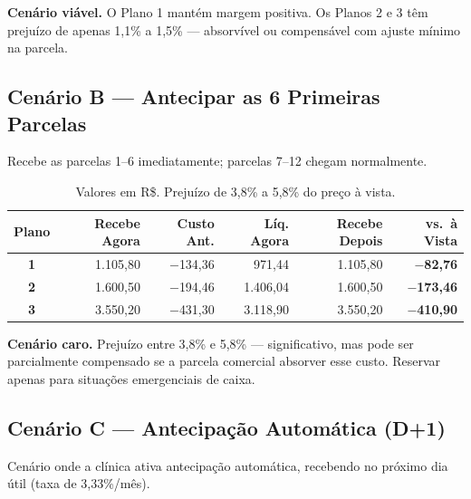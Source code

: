 \documentclass[12pt, a4paper]{article}
\begin{document}
\textcolor{successGreen}{\textbf{Cenário viável.}} O Plano 1 mantém margem positiva. Os Planos 2 e 3 têm prejuízo de apenas 1,1\% a 1,5\% — absorvível ou compensável com ajuste mínimo na parcela.

\subsection{Cenário B — Antecipar as 6 Primeiras Parcelas}

Recebe as parcelas 1--6 imediatamente; parcelas 7--12 chegam normalmente.

\begin{table}[H]
    \centering
    \footnotesize
    \renewcommand{\arraystretch}{1.4}
    \begin{tabularx}{\textwidth}{c r r r r r}
        \toprule
        \rowcolor{tableHeader} \textbf{Plano} & \textbf{Recebe Agora} & \textbf{Custo Ant.} & \textbf{Líq. Agora} & \textbf{Recebe Depois} & \textbf{vs.\ à Vista} \\
        \midrule
        \textbf{1} & 1.105,80 & $-$134,36 & 971,44 & 1.105,80 & \textcolor{warningOrange}{\textbf{$-$82,76}} \\
        \rowcolor{lightGray}
        \textbf{2} & 1.600,50 & $-$194,46 & 1.406,04 & 1.600,50 & \textcolor{warningOrange}{\textbf{$-$173,46}} \\
        \textbf{3} & 3.550,20 & $-$431,30 & 3.118,90 & 3.550,20 & \textcolor{dangerRed}{\textbf{$-$410,90}} \\
        \bottomrule
    \end{tabularx}
    \caption*{\footnotesize Valores em R\$. Prejuízo de 3,8\% a 5,8\% do preço à vista.}
\end{table}

\textcolor{warningOrange}{\textbf{Cenário caro.}} Prejuízo entre 3,8\% e 5,8\% — significativo, mas pode ser parcialmente compensado se a parcela comercial absorver esse custo. Reservar apenas para situações emergenciais de caixa.

\needspace{8cm}

\subsection{Cenário C — Antecipação Automática (D+1)}

Cenário onde a clínica ativa antecipação automática, recebendo no próximo dia útil (taxa de 3,33\%/mês).
\end{document}
